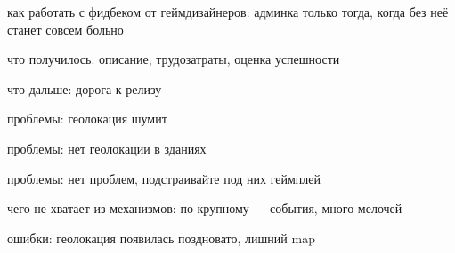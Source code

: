 \documentclass[aspectratio=169,handout,bigger]{beamer}
\begin{document}

\begin{frame}{как работать с фидбеком от геймдизайнеров: админка только тогда, когда без неё станет совсем больно}
\end{frame}


\begin{frame}{что получилось: описание, трудозатраты, оценка успешности}
\end{frame}


\begin{frame}{что дальше: дорога к релизу}
\end{frame}


\begin{frame}{проблемы: геолокация шумит}
\end{frame}


\begin{frame}{проблемы: нет геолокации в зданиях}
\end{frame}


\begin{frame}{проблемы: нет проблем, подстраивайте под них геймплей}
\end{frame}


\begin{frame}{чего не хватает из механизмов: по-крупному --- события, много мелочей}
\end{frame}


\begin{frame}{ошибки: геолокация появилась поздновато, лишний map}
\end{frame}

\end{document}
